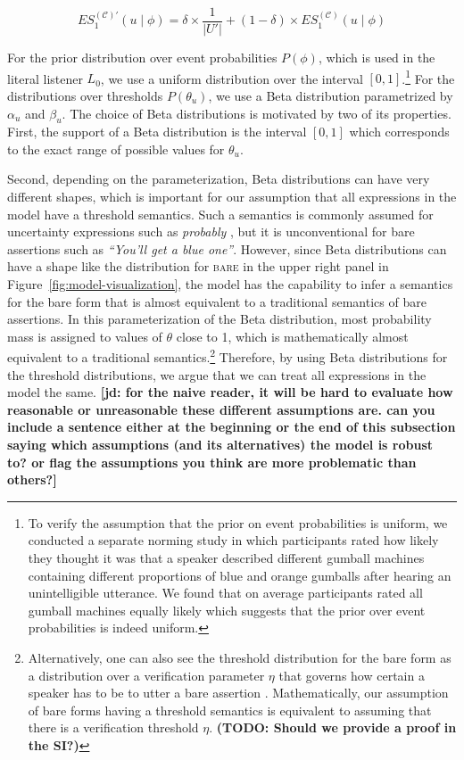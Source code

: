 \documentclass[lucida,biblatex]{sp} %
\newcommand{\jd}[1]{\textcolor{PinkyPurple}{\textbf{[jd: #1]}}}
\newcommand{\todo}[1]{}
\renewcommand{\todo}[1]{{\bf \color{red} (TODO: {#1})}}
\begin{document}
$$ES_1^{(\mathscr{C})'}(u \mid \phi) = \delta \times \frac{1}{|U'|} +  (1 - \delta) \times ES_1^{(\mathscr{C})}(u \mid \phi)$$

For the prior distribution over event probabilities $P(\phi)$, which is used in the literal listener $L_0$, 
we use a uniform distribution over the interval $[0,1]$.\footnote{To 
verify the assumption that the prior on event probabilities is uniform, we conducted a separate norming study in which participants rated 
how likely they thought it was that a speaker described different gumball machines containing different 
proportions of blue and orange gumballs after hearing an unintelligible utterance. We found that on average 
participants rated all gumball machines equally likely which suggests that the prior over event probabilities is 
indeed uniform.} For the distributions over thresholds $P(\theta_u)$, we use a Beta distribution parametrized by 
$\alpha_u$ and $\beta_u$. The choice of Beta distributions is motivated by two of its properties. First, the support of a Beta distribution 
is the interval $[0,1]$ which corresponds to the exact range of possible values for $\theta_u$.

Second, depending on the parameterization, Beta distributions can have very different shapes, which is important for 
our assumption that all expressions in the model have a threshold semantics. 
Such a semantics is commonly assumed for uncertainty expressions such as \textit{probably} \citep[e.g.,][]{Yalcin2010,Lassiter2016}, 
but it is unconventional for bare assertions such as \textit{``You'll get a blue one''}. However, since Beta distributions can have a shape 
like the distribution for \textsc{bare} in the upper right panel in Figure~\ref{fig:model-visualization}, the model has the capability to infer
a semantics for the bare form that is almost equivalent to a traditional semantics of bare assertions. In this parameterization of the
Beta distribution, most probability mass is assigned to values of $\theta$ close to 1, which is mathematically almost equivalent to
a traditional semantics.\footnote{Alternatively, one can also see the threshold distribution for the bare form as a distribution over a verification parameter $\eta$ that governs 
how certain a speaker has to be to utter a bare assertion \cite{TODO ask Dan}. Mathematically, our assumption of bare forms having a threshold
semantics is equivalent to assuming that there is a verification threshold $\eta$. \todo{Should we provide a proof in the SI?}}
Therefore, by using Beta distributions for the threshold distributions, we argue that we can treat all expressions in the model the same. \jd{for the naive reader, it will be hard to evaluate how reasonable or unreasonable these different assumptions are. can you include a sentence either at the beginning or the end of this subsection saying which assumptions (and its alternatives) the model is robust to? or flag the assumptions you think are more problematic than others?}
\end{document}

